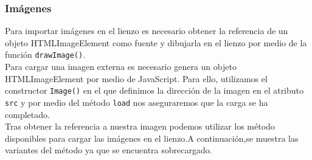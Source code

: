 \subsubsection*{Imágenes}
Para importar imágenes en el lienzo es necesario obtener la referencia de un objeto HTMLImageElement como fuente y dibujarla en el lienzo por medio de la función \texttt{drawImage()}.  
\\Para cargar una imagen externa es necesario genera un objeto HTMLImageElement por medio de JavaScript. Para ello, utilizamos el constructor \texttt{Image()} en el que definimos la dirección de la imagen en el atributo \texttt{src} y por medio del método \texttt{load} nos aseguraremos que la carga se ha completado.
\\Tras obtener la referencia a nuestra imagen podemos utilizar los método disponibles para cargar las imágenes en el lienzo.A continuación,se muestra las variantes del método ya que se encuentra sobrecargado. 
